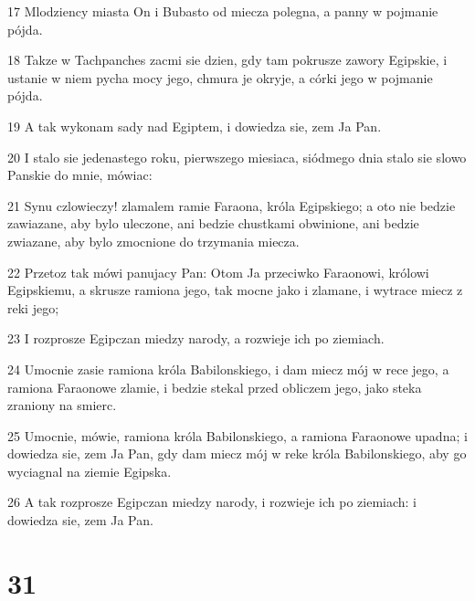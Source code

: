 \par 17 Mlodziency miasta On i Bubasto od miecza polegna, a panny w pojmanie pójda.
\par 18 Takze w Tachpanches zacmi sie dzien, gdy tam pokrusze zawory Egipskie, i ustanie w niem pycha mocy jego, chmura je okryje, a córki jego w pojmanie pójda.
\par 19 A tak wykonam sady nad Egiptem, i dowiedza sie, zem Ja Pan.
\par 20 I stalo sie jedenastego roku, pierwszego miesiaca, siódmego dnia stalo sie slowo Panskie do mnie, mówiac:
\par 21 Synu czlowieczy! zlamalem ramie Faraona, króla Egipskiego; a oto nie bedzie zawiazane, aby bylo uleczone, ani bedzie chustkami obwinione, ani bedzie zwiazane, aby bylo zmocnione do trzymania miecza.
\par 22 Przetoz tak mówi panujacy Pan: Otom Ja przeciwko Faraonowi, królowi Egipskiemu, a skrusze ramiona jego, tak mocne jako i zlamane, i wytrace miecz z reki jego;
\par 23 I rozprosze Egipczan miedzy narody, a rozwieje ich po ziemiach.
\par 24 Umocnie zasie ramiona króla Babilonskiego, i dam miecz mój w rece jego, a ramiona Faraonowe zlamie, i bedzie stekal przed obliczem jego, jako steka zraniony na smierc.
\par 25 Umocnie, mówie, ramiona króla Babilonskiego, a ramiona Faraonowe upadna; i dowiedza sie, zem Ja Pan, gdy dam miecz mój w reke króla Babilonskiego, aby go wyciagnal na ziemie Egipska.
\par 26 A tak rozprosze Egipczan miedzy narody, i rozwieje ich po ziemiach: i dowiedza sie, zem Ja Pan.

\chapter{31}

